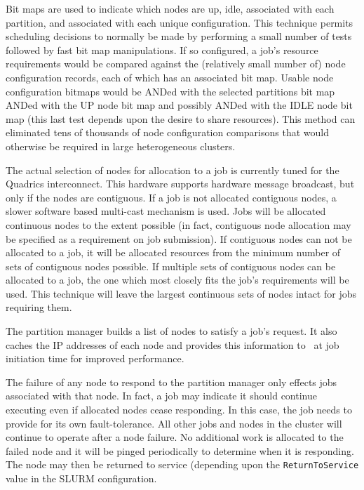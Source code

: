 Bit maps are used to indicate which nodes are up, idle, associated
with each partition, and associated with each unique configuration.
This technique permits scheduling decisions to normally be made by
performing a small number of tests followed by fast bit map manipulations. 
If so configured, a job's resource requirements would be compared 
against the (relatively small number of) node configuration records, each of 
which has an associated bit map. Usable node configuration bitmaps 
would be ANDed with the selected partitions bit map ANDed with the 
UP node bit map and possibly ANDed with the IDLE node bit map (this
last test depends upon the desire to share resources). 
This method can eliminated tens of thousands of node configuration 
comparisons that would otherwise be required in large heterogeneous 
clusters.

The actual selection of nodes for allocation to a job is currently
tuned for the Quadrics interconnect.  This hardware supports hardware
message broadcast, but only if the nodes are contiguous.  If a job
is not allocated contiguous nodes, a slower software based multi-cast
mechanism is used.  Jobs will be allocated continuous nodes to the
extent possible (in fact, contiguous node allocation may be specified 
as a requirement on job submission). 
If contiguous nodes
can not be allocated to a job, it will be allocated resources from
the minimum number of sets of contiguous nodes possible.  If multiple
sets of contiguous nodes can be allocated to a job, the one which most
closely fits the job's requirements will be used.  This technique will
leave the largest continuous sets of nodes intact for jobs requiring them.

The partition manager builds a list of nodes to satisfy a job's
request.  It also caches the IP addresses of
each node and provides this information to \srun\ at job initiation
time for improved performance.

The failure of any node to respond to the partition manager only
effects jobs associated with that node.  
In fact, a job may indicate it should continue executing even if 
allocated nodes cease responding.
In this case, the job needs to provide for its own fault-tolerance.
All other jobs and nodes in the cluster will continue to operate after
a node failure.  No additional work is allocated to the failed
node and it will be pinged periodically to determine when it is 
responding. The node may then be returned to service (depending 
upon the {\tt ReturnToService} value in the SLURM configuration. 

